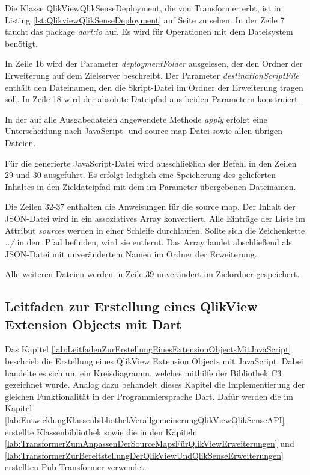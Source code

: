 Die Klasse QlikViewQlikSenseDeployment, die von Transformer erbt, ist in Listing \ref{lst:QlikviewQlikSenseDeployment} auf Seite \pageref{lst:QlikviewQlikSenseDeployment} zu sehen. In der Zeile 7 taucht das package \textit{dart:io} auf. Es wird für Operationen mit dem Dateisystem benötigt.

In Zeile 16 wird der Parameter \textit{deploymentFolder} ausgelesen, der den Ordner der Erweiterung auf dem Zielserver beschreibt. Der Parameter \textit{destinationScriptFile} enthält den Dateinamen, den die Skript-Datei im Ordner der Erweiterung tragen soll. In Zeile 18 wird der absolute Dateipfad aus beiden Parametern konstruiert.

In der auf alle Ausgabedateien angewendete Methode \textit{apply} erfolgt eine Unterscheidung nach JavaScript- und source map-Datei sowie allen übrigen Dateien.

Für die generierte JavaScript-Datei wird ausschließlich der Befehl in den Zeilen 29 und 30 ausgeführt. Es erfolgt lediglich eine Speicherung des gelieferten Inhaltes in den Zieldateipfad mit dem im Parameter übergebenen Dateinamen.

Die Zeilen 32-37 enthalten die Anweisungen für die source map. Der Inhalt der JSON-Datei wird in ein assoziatives Array konvertiert. Alle Einträge der Liste im Attribut \textit{sources} werden in einer Schleife durchlaufen. Sollte sich die Zeichenkette \textit{../} in dem Pfad befinden, wird sie entfernt. Das Array landet abschließend als JSON-Datei mit unverändertem Namen im Ordner der Erweiterung.

Alle weiteren Dateien werden in Zeile 39 unverändert im Zielordner gespeichert.





\newpage
\subsection{Leitfaden zur Erstellung eines QlikView Extension Objects mit Dart}
\label{lab:LeitfadenZurErstellungEinesQlikViewExtensionObjectsMitDart} 

Das Kapitel \ref{lab:LeitfadenZurErstellungEinesExtensionObjectsMitJavaScript} beschrieb die Erstellung eines QlikView Extension Objects mit JavaScript. Dabei handelte es sich um ein Kreisdiagramm, welches mithilfe der Bibliothek C3 gezeichnet wurde. Analog dazu behandelt dieses Kapitel die Implementierung der gleichen Funktionalität in der Programmiersprache Dart. Dafür werden die im Kapitel \ref{lab:EntwicklungKlassenbibliothekVerallgemeinerungQlikViewQlikSenseAPI} erstellte Klassen\-bibliothek sowie die in den Kapiteln \ref{lab:TransformerZumAnpassenDerSourceMapsFürQlikViewErweiterungen} und \ref{lab:TransformerZurBereitstellungDerQlikViewUndQlikSenseErweiterungen} erstellten Pub Transformer verwendet.

